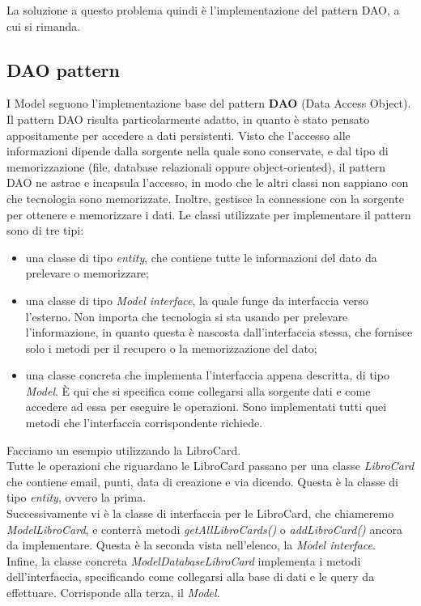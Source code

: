 \documentclass[a4paper,11pt]{report}
\begin{document}
La soluzione a questo problema quindi è l'implementazione del pattern DAO, a cui si rimanda.

\subsection{DAO pattern}
I Model seguono l'implementazione base del pattern \textbf{DAO} (Data Access Object).\\ 
Il pattern DAO risulta particolarmente adatto, in quanto è stato pensato appositamente per accedere a dati persistenti. Visto che l'accesso alle informazioni dipende dalla sorgente nella quale sono conservate, e dal tipo di memorizzazione (file, database relazionali oppure object-oriented), il pattern DAO ne astrae e incapsula l'accesso, in modo che le altri classi non sappiano con che tecnologia sono memorizzate. Inoltre, gestisce la connessione con la sorgente per ottenere e memorizzare i dati.
\newline
Le classi utilizzate per implementare il pattern sono di tre tipi: 
\begin{itemize}
    \item una classe di tipo \textit{entity}, che contiene tutte le informazioni del dato da prelevare o memorizzare;
    \item una classe di tipo \textit{Model interface}, la quale funge da interfaccia verso l'esterno. Non importa che tecnologia si sta usando per prelevare l'informazione, in quanto questa è nascosta dall'interfaccia stessa, che fornisce solo i metodi per il recupero o la memorizzazione del dato;
    \item una classe concreta che implementa l'interfaccia appena descritta, di tipo \textit{Model}. È qui che si specifica come collegarsi alla sorgente dati e come accedere ad essa per eseguire le operazioni. Sono implementati tutti quei metodi che l'interfaccia corrispondente richiede.
\end{itemize}

Facciamo un esempio utilizzando la LibroCard.\\
Tutte le operazioni che riguardano le LibroCard passano per una classe \textit{LibroCard} che contiene email, punti, data di creazione e via dicendo. Questa è la classe di tipo \textit{entity}, ovvero la prima.\\
Successivamente vi è la classe di interfaccia per le LibroCard, che chiameremo \textit{ModelLibroCard}, e conterrà metodi \textit{getAllLibroCards()} o \textit{addLibroCard()} ancora da implementare. Questa è la seconda vista nell'elenco, la \textit{Model interface}.\\
Infine, la classe concreta \textit{ModelDatabaseLibroCard} implementa i metodi dell'interfaccia, specificando come collegarsi alla base di dati e le query da effettuare. Corrisponde alla terza, il \textit{Model}.\\
\end{document}
